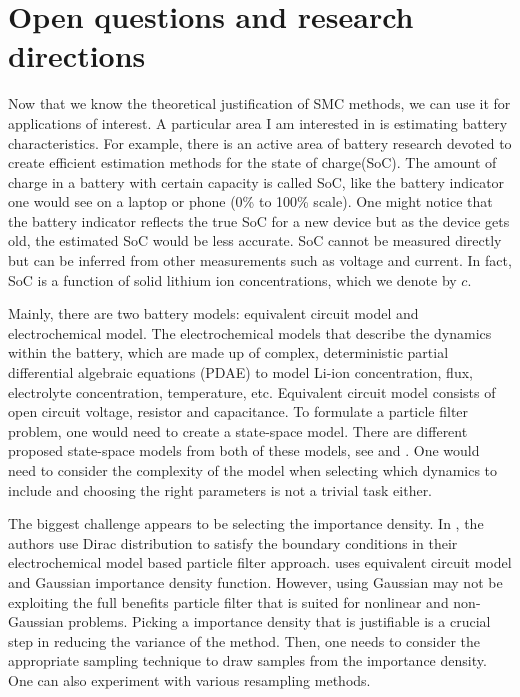 

\section{Open questions and research directions}


Now that we know the theoretical justification of SMC methods, we can use it for applications of interest. A particular area I am interested in is estimating battery characteristics. For example, there is an active area of battery research devoted to create efficient estimation methods for the state of charge(SoC). The amount of charge in a battery with certain capacity is called SoC, like the battery indicator one would see on a laptop or phone (0\% to 100\% scale). One might notice that the battery indicator reflects the true SoC for a new device but as the device gets old, the estimated SoC would be less accurate. SoC cannot be measured directly but can be inferred from other measurements such as voltage and current. In fact, SoC is a function of solid lithium ion concentrations, which we denote by $c$.

Mainly, there are two battery models: equivalent circuit model and electrochemical model. The electrochemical models that describe the dynamics within the battery, which are made up of complex, deterministic partial differential algebraic equations (PDAE) to model Li-ion concentration, flux, electrolyte concentration, temperature, etc. Equivalent circuit model consists of open circuit voltage, resistor and capacitance. To formulate a particle filter problem, one would need to create a state-space model. There are different proposed state-space models from both of these models, see \cite{he2011evaluation} and \cite{tulsyan2016state}. One would need to consider the complexity of the model when selecting which dynamics to include and choosing the right parameters is not a trivial task either. 

The biggest challenge appears to be selecting the importance density. In \cite{tulsyan2016state}, the authors use Dirac distribution to satisfy the boundary conditions in their electrochemical model based particle filter approach. \cite{miao2013remaining} uses equivalent circuit model and Gaussian importance density function. However, using Gaussian may not be exploiting the full benefits particle filter that is suited for nonlinear and non-Gaussian problems. Picking a importance density that is justifiable is a crucial step in reducing the variance of the method. Then, one needs to consider the appropriate sampling technique to draw samples from the importance density. One can also experiment with various resampling methods. 

 